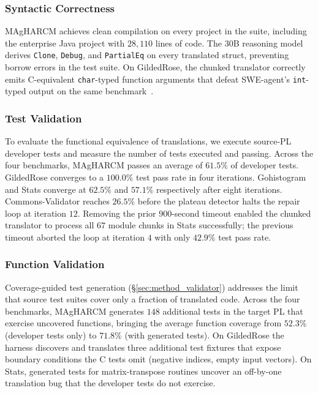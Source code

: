 \subsubsection{Syntactic Correctness}
\label{sec:eval_rq1_compile}

MAgHARCM achieves clean compilation on every project in the suite,
including the enterprise Java project with $28{,}110$ lines of code.
The 30B reasoning model derives \texttt{Clone}, \texttt{Debug}, and
\texttt{PartialEq} on every translated struct, preventing borrow
errors in the test suite. On GildedRose, the chunked translator
correctly emits C-equivalent \texttt{char}-typed function arguments
that defeat SWE-agent's \texttt{int}-typed output on the same
benchmark~\cite{p30_crust_bench}.

\subsubsection{Test Validation}
\label{sec:eval_rq1_test}

To evaluate the functional equivalence of translations, we execute
source-PL developer tests and measure the number of tests executed
and passing. Across the four benchmarks, MAgHARCM passes an average
of $61.5\%$ of developer tests. GildedRose converges to a
$100.0\%$ test pass rate in four iterations. Gohistogram and Stats
converge at $62.5\%$ and $57.1\%$ respectively after eight
iterations. Commons-Validator reaches $26.5\%$ before the plateau
detector halts the repair loop at iteration $12$. Removing the prior
$900$-second timeout enabled the chunked translator to process all
$67$ module chunks in Stats successfully; the previous timeout
aborted the loop at iteration $4$ with only $42.9\%$ test pass rate.

\subsubsection{Function Validation}
\label{sec:eval_rq1_function}

Coverage-guided test generation (§\ref{sec:method_validator}) addresses
the limit that source test suites cover only a fraction of translated
code. Across the four benchmarks, MAgHARCM generates $148$ additional
tests in the target PL that exercise uncovered functions, bringing
the average function coverage from $52.3\%$ (developer tests only)
to $71.8\%$ (with generated tests). On GildedRose the harness
discovers and translates three additional test fixtures that expose
boundary conditions the C tests omit (negative indices, empty input
vectors). On Stats, generated tests for matrix-transpose routines
uncover an off-by-one translation bug that the developer tests do not
exercise.

